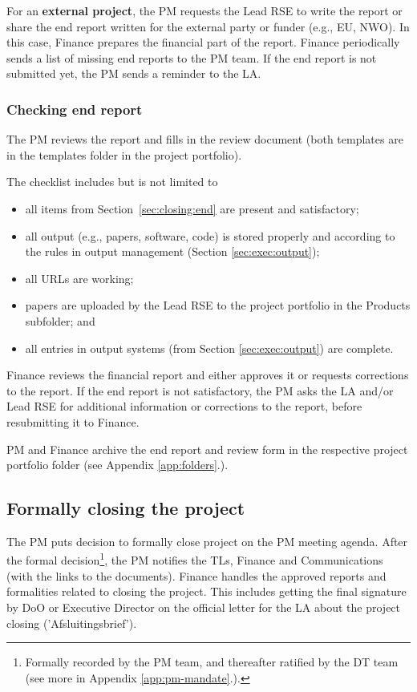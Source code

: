 For an \textbf{external project}, the PM requests the Lead RSE to write the report or share the end report written for
the external party or funder (e.g., EU, NWO). In this case, Finance prepares the financial part of the report. Finance
periodically sends a list of missing end reports to the PM team. If the end report is not submitted yet, the PM sends a
reminder to the LA.

\subsubsection{Checking end report}
The PM reviews the report and fills in the review document (both templates are in the templates folder in the project
portfolio).

The checklist includes but is not limited to
\begin{itemize}
\item all items from Section~\ref{sec:closing:end} are present and satisfactory;
\item all output (e.g., papers, software, code) is stored properly and according to the rules in output management (Section
\ref{sec:exec:output});
\item all URLs are working;
\item papers are uploaded by the Lead RSE to the project portfolio in the Products subfolder; and
\item all entries in output systems (from Section \ref{sec:exec:output}) are complete.
\end{itemize}

Finance reviews the financial report and either approves it or requests corrections to the report. If the end report is not
satisfactory, the PM asks the LA and/or Lead RSE for additional information or corrections to the report, before
resubmitting it to Finance. 

PM and Finance archive the end report and review form in the respective project portfolio folder (see Appendix
\ref{app:folders}.).

\subsection{Formally closing the project}
The PM puts decision to formally close project on the PM meeting agenda. After the formal decision\footnote{Formally
recorded by the PM team, and thereafter ratified by the DT team (see more in Appendix \ref{app:pm-mandate}.).}, the PM
notifies the TLs, Finance and Communications (with the links to the documents). Finance handles the approved reports and
formalities related to closing the project. This includes getting the final signature by DoO or Executive Director on
the official letter for the LA about the project closing ('Afsluitingsbrief').


